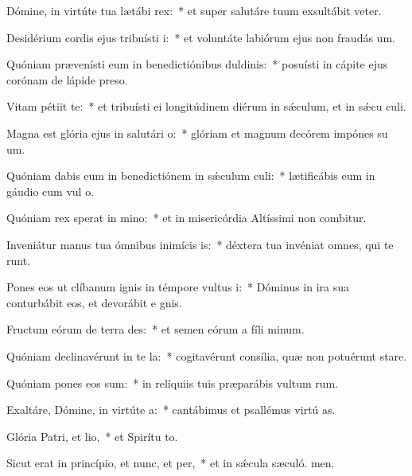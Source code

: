 \item Dómine, in virtúte tua lætábi rex:~* et super salutáre tuum exsultábit veter.
\item Desidérium cordis ejus tribuísti i:~* et voluntáte labiórum ejus non fraudás um.
\item Quóniam prævenísti eum in benedictiónibus duldinis:~* posuísti in cápite ejus corónam de lápide preso.
\item Vitam pétiit  te:~* et tribuísti ei longitúdinem diérum in sǽculum, et in sǽcu culi.
\item Magna est glória ejus in salutári o:~* glóriam et magnum decórem impónes su um.
\item Quóniam dabis eum in benedictiónem in sǽculum culi:~* lætificábis eum in gáudio cum vul o.
\item Quóniam rex sperat in mino:~* et in misericórdia Altíssimi non combitur.
\item Inveniátur manus tua ómnibus inimícis is:~* déxtera tua invéniat omnes, qui te runt.
\item Pones eos ut clíbanum ignis in témpore vultus i:~* Dóminus in ira sua conturbábit eos, et devorábit e gnis.
\item Fructum eórum de terra des:~* et semen eórum a fíli minum.
\item Quóniam declinavérunt in te la:~* cogitavérunt consília, quæ non potuérunt stare.
\item Quóniam pones eos sum:~* in relíquiis tuis præparábis vultum rum.
\item Exaltáre, Dómine, in virtúte a:~* cantábimus et psallémus virtú as.
\item Glória Patri, et lio,~* et Spirítu to.
\item Sicut erat in princípio, et nunc, et per,~* et in sǽcula sæculó. men.
